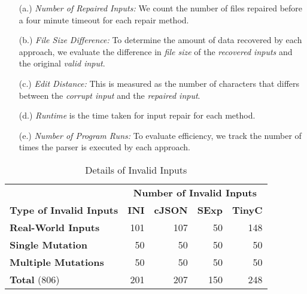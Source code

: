 \documentclass[acmsmall,screen,review,anonymous]{acmart}
\begin{document}
\begin{itemize}

\item[(a.)] \textit{Number of Repaired Inputs:} We count the number of files repaired before
a four minute timeout for each repair method.
 
\item[(b.)]  \textit{File Size Difference:} To determine the amount of data recovered by each approach, 
we evaluate the difference in \emph{file size} of
the \emph{recovered inputs} and the original
\emph{valid input}. %

\item[(c.)]  \textit{Edit Distance:} This is measured as the number of characters that
differs between the \emph{corrupt input} and the \emph{repaired input}.

\item[(d.)]  \textit{Runtime} is the time taken for input repair for each method.

\item[(e.)]  \textit{Number of Program Runs:} To evaluate efficiency, we track the number of times the parser is executed by each approach. 

\end{itemize}



\begin{table}[!tbp]\centering
\caption{Details of Invalid 
Inputs}
\begin{tabular}{|l | r | r | r | r |}
\hline
&  \multicolumn{4}{c|}{\textbf{Number of Invalid Inputs}}  \\
\textbf{Type of Invalid Inputs} & \textbf{INI} & \textbf{cJSON} & \textbf{SExp} & \textbf{TinyC} \\
\hline
\textbf{Real-World Inputs} & 101 & 107 & 50 & 148 \\
\textbf{Single Mutation} & 50 & 50 & 50 & 50 \\
\textbf{Multiple Mutations} & 50 & 50 & 50 & 50 \\
\hline
\textbf{Total } (806) & 201 & 207 & 150 & 248 \\
\hline
\end{tabular}
\label{tab:input-details}
\end{table}
\end{document}
